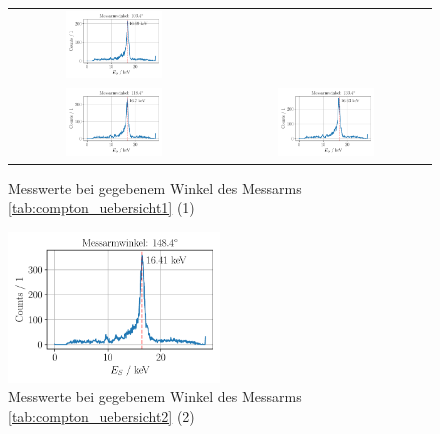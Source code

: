 \documentclass[ngerman]{scrartcl}
\begin{document}
\begin{figure}[H]
\begin{tabular}{cc}
        \includegraphics[width=0.48\textwidth]{../plots/energie_spektren_6.pdf}   \\
        \includegraphics[width=0.48\textwidth]{../plots/energie_spektren_7.pdf} &
        \includegraphics[width=0.48\textwidth]{../plots/energie_spektren_8.pdf}   \\
    \end{tabular}
    \caption{Messwerte bei gegebenem Winkel des Messarms \autoref{tab:compton_uebersicht1} (1)}
    \label{fig:DS_interferenzmuster}
\end{figure}
\begin{figure}[H]
    \centering
    \begin{samepage}
        \includegraphics[width=0.5\textwidth]{../plots/energie_spektren_9.pdf}
        \caption{Messwerte bei gegebenem Winkel des Messarms \autoref{tab:compton_uebersicht2} (2)}
        \label{fig:DS_interferenzmuster_final}
    \end{samepage}
\end{figure}
\end{document}
